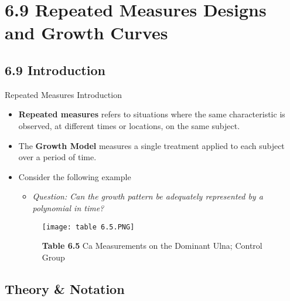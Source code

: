 \documentclass[8pt]{beamer}
\begin{document}
    

\section{6.9 Repeated Measures Designs and Growth Curves}

\subsection{6.9 Introduction}
    \begin{frame}{Repeated Measures Introduction} %
        \begin{itemize}
            \item \textbf{Repeated measures} refers to situations where the same characteristic is observed, at different times or locations, on the same subject. 
            \item The \textbf{Growth Model} measures a single treatment applied to each subject over a period of time.  
            \item Consider the following example
            \begin{itemize}
                \item \textit{Question: Can the growth pattern be adequately represented by a polynomial in time?}
            \end{itemize}
            
    \begin{figure}
        \texttt{[image: table 6.5.PNG]}
        \caption{\textbf{Table 6.5} Ca Measurements on the Dominant Ulna; Control Group}
    \end{figure}

        \end{itemize}
    \end{frame}


\subsection{Theory \& Notation}
\end{document}
